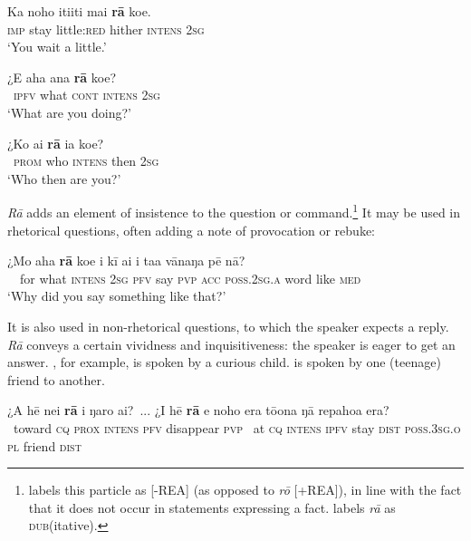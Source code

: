 \ea\label{ex:4.176}
\gll Ka noho {\ꞌ}iti{\ꞌ}iti mai \textbf{rā} koe. \\
\textsc{imp} stay little:\textsc{red} hither \textsc{intens} \textsc{2sg} \\

\glt 
‘You wait a little.’ \textstyleExampleref{[R208.164]} 
\z

\ea\label{ex:4.177}
\gll ¿E aha {\ꞌ}ana \textbf{rā} koe? \\
~\textsc{ipfv} what \textsc{cont} \textsc{intens} \textsc{2sg} \\

\glt 
‘What are you doing?’ \textstyleExampleref{[R212.054]} 
\z

\ea\label{ex:4.178}
\gll ¿Ko ai \textbf{rā} ia koe? \\
~\textsc{prom} who \textsc{intens} then \textsc{2sg} \\

\glt 
‘Who then are you?’ \textstyleExampleref{[R314.099]} 
\z

\textit{Rā} adds an element of insistence to the question or command.\footnote{\label{fn:207}\citet{DuFeu1987,DuFeu1996} labels this particle as [-REA] (as opposed to \textit{rō} [+REA]), in line with the fact that it does not occur in statements expressing a fact. \citet{WeberR2003} labels \textit{rā} as \textsc{dub}(itative).} It may be used in rhetorical questions, often adding a note of provocation or rebuke:

\ea\label{ex:4.179}
\gll ¿Mo aha \textbf{rā} koe i kī ai i ta{\ꞌ}a vānaŋa pē nā? \\
~~for what \textsc{intens} \textsc{2sg} \textsc{pfv} say \textsc{pvp} \textsc{acc} \textsc{poss.2sg.a} word like \textsc{med} \\

\glt 
‘Why did you say something like that?’ \textstyleExampleref{[R301.301]} 
\z

It is also used in non-rhetorical questions, to which the speaker expects a reply. \textit{Rā} conveys a certain vividness and inquisitiveness: the speaker is eager to get an answer. , for example, is spoken by a curious child.  is spoken by one (teenage) friend to another.

\ea\label{ex:4.180}
\gll ¿A hē nei \textbf{rā} i ŋaro ai?~... ¿{\ꞌ}I hē \textbf{rā} e noho era  tō{\ꞌ}ona ŋā repahoa era?\\
~toward \textsc{cq} \textsc{prox} \textsc{intens} \textsc{pfv} disappear \textsc{pvp} ~at \textsc{cq} \textsc{intens} \textsc{ipfv} stay \textsc{dist}  \textsc{poss.3sg.o} \textsc{pl} friend \textsc{dist}\\


